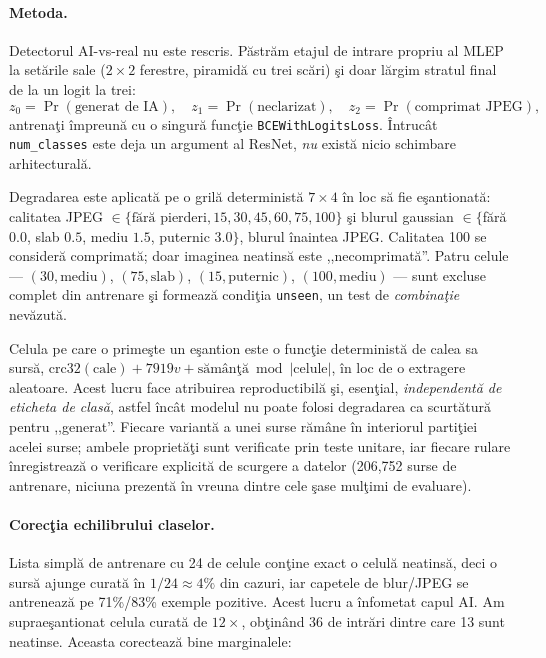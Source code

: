 \paragraph{Metoda.} Detectorul AI-vs-real nu este rescris. Păstrăm etajul de
intrare propriu al MLEP la setările sale ($2\times2$ ferestre, piramidă cu trei
scări) şi doar lărgim stratul final de la un logit la trei:
\[
  z_0 = \Pr(\text{generat de IA}), \quad
  z_1 = \Pr(\text{neclarizat}), \quad
  z_2 = \Pr(\text{comprimat JPEG}),
\]
antrenaţi împreună cu o singură funcţie \texttt{BCEWithLogitsLoss}. Întrucât
\texttt{num\_classes} este deja un argument al ResNet, \emph{nu} există nicio
schimbare arhitecturală.

Degradarea este aplicată pe o grilă deterministă $7 \times 4$ în loc să fie
eşantionată: calitatea JPEG $\in \{\text{fără pierderi}, 15, 30, 45, 60, 75, 100\}$
şi blurul gaussian $\in \{$fără $0.0$, slab $0.5$, mediu $1.5$, puternic $3.0\}$,
blurul înaintea JPEG. Calitatea 100 se consideră comprimată; doar imaginea
neatinsă este ,,necomprimată''. Patru celule --- $(30,\text{mediu})$,
$(75,\text{slab})$, $(15,\text{puternic})$, $(100,\text{mediu})$ --- sunt
excluse complet din antrenare şi formează condiţia \texttt{unseen}, un test de
\emph{combinaţie} nevăzută.

Celula pe care o primeşte un eşantion este o funcţie deterministă de calea sa
sursă, $\text{crc32}(\text{cale}) + 7919v + \text{sămânţă} \bmod |\text{celule}|$,
în loc de o extragere aleatoare. Acest lucru face atribuirea reproductibilă şi,
esenţial, \emph{independentă de eticheta de clasă}, astfel încât modelul nu poate
folosi degradarea ca scurtătură pentru ,,generat''. Fiecare variantă a unei surse
rămâne în interiorul partiţiei acelei surse; ambele proprietăţi sunt verificate
prin teste unitare, iar fiecare rulare înregistrează o verificare explicită de
scurgere a datelor (206{,}752 surse de antrenare, niciuna prezentă în vreuna
dintre cele şase mulţimi de evaluare).

\paragraph{Corecţia echilibrului claselor.} Lista simplă de antrenare cu 24 de
celule conţine exact o celulă neatinsă, deci o sursă ajunge curată în
$1/24 \approx 4\%$ din cazuri, iar capetele de blur/JPEG se antrenează pe
71\%/83\% exemple pozitive. Acest lucru a înfometat capul AI. Am supraeşantionat
celula curată de $12\times$, obţinând 36 de intrări dintre care 13 sunt
neatinse. Aceasta corectează bine marginalele:

